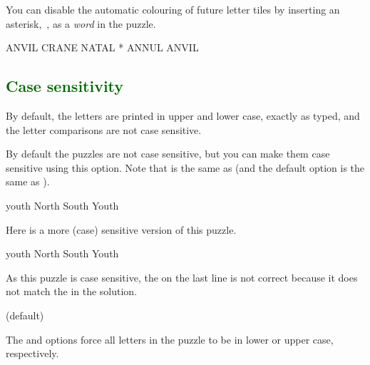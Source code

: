 \documentclass[svgnames]{report}
\newcommand\Section[1]{\subsection{\textcolor{DarkGreen}{#1}}}
\begin{document}
  \option[]{*}

  You can disable the automatic colouring of future letter tiles by
  inserting an asterisk,~\option{*}, as a \textit{word} in the puzzle.

  \begin{example}
    \begin{wordle}{ANVIL}
      CRANE
      NATAL
      *
      ANNUL
      ANVIL
    \end{wordle}
  \end{example}


  \Section{Case sensitivity}

  By default, the letters are printed in upper and lower case, exactly
  as typed, and the letter comparisons are not case sensitive.


  By default the  puzzles are not case sensitive, but
  you can make them case sensitive using this option. Note that
   is the same as 
  (and the default option is the same as
  ).

  \begin{example}
    \begin{wordle}[case sensitive=false]{youth} %
      North
      South
      Youth
    \end{wordle}
  \end{example}

  Here is a more (case) sensitive version of this puzzle.

  \begin{example}
    \begin{wordle}{youth}
      North
      South
      Youth
    \end{wordle}
  \end{example}

  As this puzzle is case sensitive, the  on the last line
  is not correct because it does not match the  in the
  solution.

   (default) \qquad
   \qquad

  The  and  options force all
  letters in the puzzle to be in lower or upper case, respectively.
\end{document}
